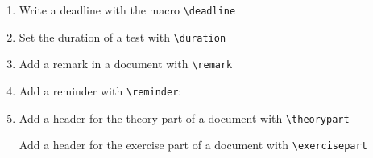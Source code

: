\documentclass[12pt,a4page]{article}
\def\cellwidth{0.4\textwidth}
\newcommand{\miniexample}[3][t]{%
  \parbox[#1][#3][t]{\cellwidth}{#2}
}
\newcommand{\codeexample}[3][c]{%
  \colorbox[HTML]{b0c4be}{\miniexample[#1]{}{#3}}
}
\newcommand{\textexample}[3][c]{%
  {\footnotesize
    \colorbox[gray]{0.9}{\miniexample[#1]{}{#3}}%
  }
}
\newcommand{\examplerow}[3][10pt]{%
  \par\noindent\strut\hfill\codeexample{#2}{#3}\hspace{#1}\textexample{#2}{#3}\hfill\strut
}
\newlength{\exheight}
\begin{document}
\begin{enumerate}
  We can pass a date using the macros \verb|\setdate| and \verb|\getdate|.
  \examplerow{exampleMacroNameDate03.tex}{\exheight}
\item Write a deadline with the macro \verb|\deadline|
  \setlength{\exheight}{12pt}
  \examplerow{exampleMacroDeadline.tex}{\exheight}
\item Set the duration of a test with \verb|\duration|
  \setlength{\exheight}{36pt}
  \examplerow{exampleMacroDuration.tex}{\exheight}
\item Add a remark in a document with \verb|\remark|
  \setlength{\exheight}{36pt}
  \examplerow{exampleMacroRemark.tex}{\exheight}
\item Add a reminder with \verb|\reminder|:
  \setlength{\exheight}{24pt}
  \examplerow{exampleMacroReminder.tex}{\exheight}
\item Add a header for the theory part of a document with \verb|\theorypart|
  \setlength{\exheight}{32pt}
  \examplerow{exampleMacroTheorypart.tex}{\exheight}

  Add a header for the exercise part of a document with \verb|\exercisepart|
  \examplerow{exampleMacroExercisepart.tex}{\exheight}


\end{enumerate}
\end{document}
